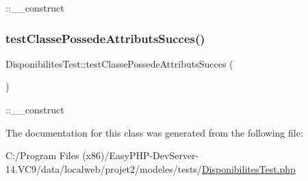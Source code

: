 \+::\+\_\+\+\_\+construct \mbox{\label{class_disponibilites_test_a935a6b85c781072a4bff6478af6c5f3d}} 
\subsubsection{\texorpdfstring{test\+Classe\+Possede\+Attributs\+Succes()}{testClassePossedeAttributsSucces()}}
{\footnotesize\ttfamily Disponibilites\+Test\+::test\+Classe\+Possede\+Attributs\+Succes (\begin{DoxyParamCaption}{ }\end{DoxyParamCaption})}

\+::\+\_\+\+\_\+construct 

The documentation for this class was generated from the following file\+:\begin{DoxyCompactItemize}
\item 
C\+:/\+Program Files (x86)/\+Easy\+P\+H\+P-\/\+Dev\+Server-\/14.\+V\+C9/data/localweb/projet2/modeles/tests/\hyperlink{_disponibilites_test_8php}{Disponibilites\+Test.\+php}\end{DoxyCompactItemize}
